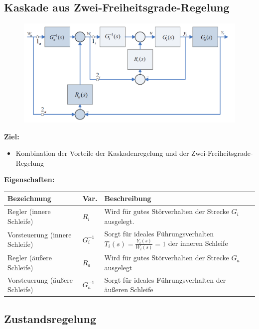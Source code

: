 \documentclass[10pt,a4paper]{article}
\begin{document}
\subsection{Kaskade aus Zwei-Freiheitsgrade-Regelung}
\begin{figure}[H]
	\includegraphics[width=0.8\columnwidth]{imgs/abb7_8.png}
\end{figure}

\textbf{Ziel:}
\begin{itemize}
	\item Kombination der Vorteile der Kaskadenregelung und der Zwei-Freiheitsgrade-Regelung
\end{itemize}

\textbf{Eigenschaften:} ~\\
\begin{tabularx}{\columnwidth}{llX}
	Bezeichnung & Var. & Beschreibung \\
	\hline
	Regler (innere Schleife) & $R_i$ & Wird für gutes Störverhalten der Strecke $G_i$ ausgelegt. \\
	Vorsteuerung (innere Schleife) & $G_i^{-1}$ & Sorgt für ideales Führungsverhalten $T_i(s) = \frac{Y_i(s)}{W_i(s)} = 1$ der inneren Schleife \\
	Regler (äußere Schleife) & $R_a$ & Wird für gutes Störverhalten der Strecke $G_a$ ausgelegt \\
	Vorsteuerung (äußere Schleife) & $G_a^{-1}$ & Sorgt für ideales Führungsverhalten der äußeren Schleife \\
\end{tabularx}

\subsection{Zustandsregelung}
\end{document}
